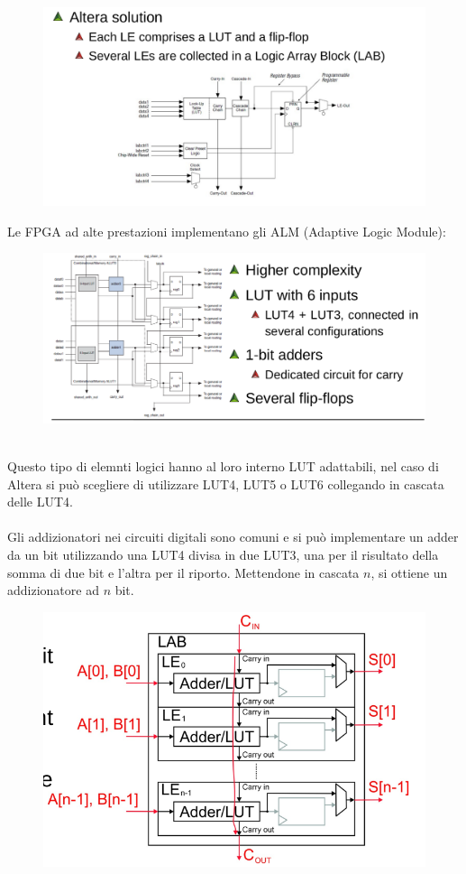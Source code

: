 \documentclass{book}
\begin{document}
    \begin{figure}[h!]
        \centering
        \includegraphics[width=1\linewidth]{img/chapt4img9.png}
    \end{figure}
    \newpage
    Le FPGA ad alte prestazioni implementano gli ALM (Adaptive Logic Module):
    \begin{figure}[h!]
        \centering
        \includegraphics[width=0.75\linewidth]{img/chapt4img10.png}
    \end{figure} \\
    Questo tipo di elemnti logici hanno al loro interno LUT adattabili, nel caso di Altera si può scegliere di utilizzare LUT4, LUT5 o LUT6 collegando in cascata delle LUT4. \\ \\
    Gli addizionatori nei circuiti digitali sono comuni e si può implementare un adder da un bit utilizzando una LUT4 divisa in due LUT3, una per il risultato della somma di due bit e l'altra per il riporto. Mettendone in cascata $n$, si ottiene un addizionatore ad $n$ bit.
    \begin{figure}[h!]
        \centering
        \includegraphics[width=0.75\linewidth]{img/chapt4img11.png}
    \end{figure}
\end{document}
